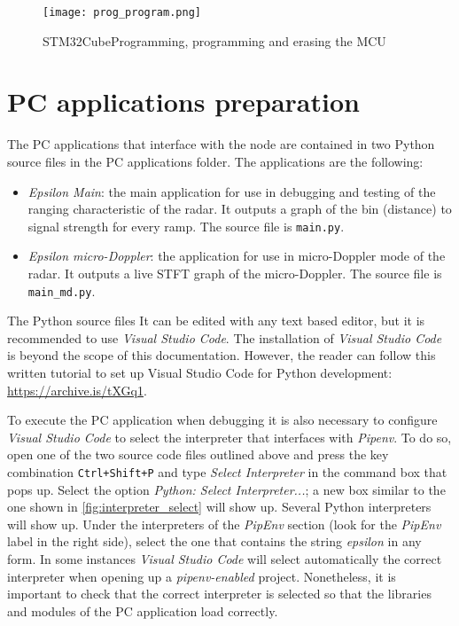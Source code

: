 \begin{figure}[ht]
	\centering
	\texttt{[image: prog\_program.png]}
	\caption{STM32CubeProgramming, programming and erasing the MCU \label{fig:prog_program}}
\end{figure}

\section{PC applications preparation}

The PC applications that interface with the node are contained in two Python source files in the PC applications folder. The applications are the following:
\begin{itemize}
	\item \textit{Epsilon Main}: the main application for use in debugging and testing of the ranging characteristic of the radar. It outputs a graph of the bin (distance) to signal strength for every ramp. The source file is \texttt{main.py}.
	\item \textit{Epsilon micro-Doppler}: the application for use in micro-Doppler mode of the radar. It outputs a live STFT graph of the micro-Doppler. The source file is \texttt{main\_md.py}.
\end{itemize}

The Python source files It can be edited with any text based editor, but it is recommended to use \textit{Visual Studio Code}. The installation of \textit{Visual Studio Code} is beyond the scope of this documentation. However, the reader can follow this written tutorial to set up Visual Studio Code for Python development: \url{https://archive.is/tXGq1}.

To execute the PC application when debugging it is also necessary to configure \textit{Visual Studio Code} to select the interpreter that interfaces with \textit{Pipenv}. To do so, open one of the two source code files outlined above and press the key combination \texttt{Ctrl+Shift+P} and type \textit{Select Interpreter} in the command box that pops up. Select the option \textit{Python: Select Interpreter...}; a new box similar to the one shown in \cref{fig:interpreter_select} will show up. Several Python interpreters will show up. Under the interpreters of the \textit{PipEnv} section (look for the \textit{PipEnv} label in the right side), select the one that contains the string \textit{epsilon} in any form. In some instances \textit{Visual Studio Code} will select automatically the correct interpreter when opening up a \textit{pipenv-enabled} project. Nonetheless, it is important to check that the correct interpreter is selected so that the libraries and modules of the PC application load correctly.

